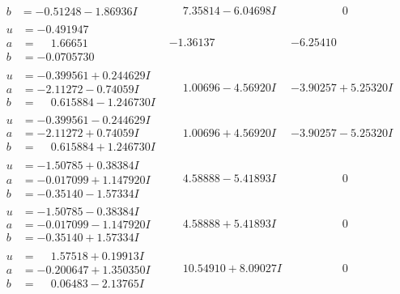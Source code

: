 \documentclass[1p]{elsarticle_modified}
\theoremstyle{definition}
\begin{document}
$$\begin{array}{c|c|c}
\begin{aligned}
b &= -0.51248 - 1.86936 I\end{aligned}
 & \phantom{-}7.35814 - 6.04698 I & \phantom{-0.000000 } 0 \\ \hline\begin{aligned}
u &= -0.491947\phantom{ +0.000000I} \\
a &= \phantom{-}1.66651\phantom{ +0.000000I} \\
b &= -0.0705730\phantom{ +0.000000I}\end{aligned}
 & -1.36137\phantom{ +0.000000I} & -6.25410\phantom{ +0.000000I} \\ \hline\begin{aligned}
u &= -0.399561 + 0.244629 I \\
a &= -2.11272 - 0.74059 I \\
b &= \phantom{-}0.615884 - 1.246730 I\end{aligned}
 & \phantom{-}1.00696 - 4.56920 I & -3.90257 + 5.25320 I \\ \hline\begin{aligned}
u &= -0.399561 - 0.244629 I \\
a &= -2.11272 + 0.74059 I \\
b &= \phantom{-}0.615884 + 1.246730 I\end{aligned}
 & \phantom{-}1.00696 + 4.56920 I & -3.90257 - 5.25320 I \\ \hline\begin{aligned}
u &= -1.50785 + 0.38384 I \\
a &= -0.017099 + 1.147920 I \\
b &= -0.35140 - 1.57334 I\end{aligned}
 & \phantom{-}4.58888 - 5.41893 I & \phantom{-0.000000 } 0 \\ \hline\begin{aligned}
u &= -1.50785 - 0.38384 I \\
a &= -0.017099 - 1.147920 I \\
b &= -0.35140 + 1.57334 I\end{aligned}
 & \phantom{-}4.58888 + 5.41893 I & \phantom{-0.000000 } 0 \\ \hline\begin{aligned}
u &= \phantom{-}1.57518 + 0.19913 I \\
a &= -0.200647 + 1.350350 I \\
b &= \phantom{-}0.06483 - 2.13765 I\end{aligned}
 & \phantom{-}10.54910 + 8.09027 I & \phantom{-0.000000 } 0 \\ \hline\begin{aligned}

\end{aligned}
\end{array}$$
\end{document}
